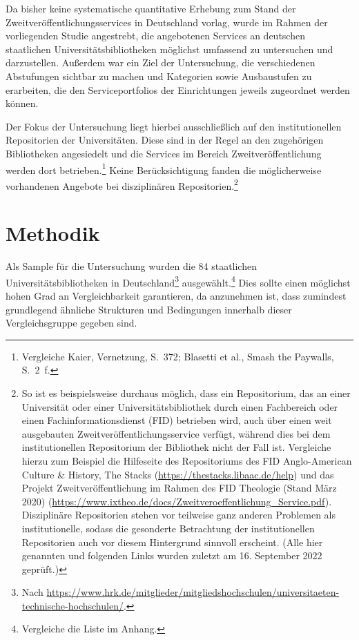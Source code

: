 \documentclass[a4paper,
fontsize=11pt,
oneside,
numbers=noperiodatend,
parskip=half-,
bibliography=totoc,
final
]{scrartcl}
\begin{document}
Da bisher keine systematische quantitative Erhebung zum Stand der
Zweitveröffentlichungsservices in Deutschland vorlag, wurde im Rahmen
der vorliegenden Studie angestrebt, die angebotenen Services an
deutschen staatlichen Universitätsbibliotheken möglichst umfassend zu
untersuchen und darzustellen. Außerdem war ein Ziel der Untersuchung,
die verschiedenen Abstufungen sichtbar zu machen und Kategorien sowie
Ausbaustufen zu erarbeiten, die den Serviceportfolios der Einrichtungen
jeweils zugeordnet werden können.

Der Fokus der Untersuchung liegt hierbei ausschließlich auf den
institutionellen Repositorien der Universitäten. Diese sind in der Regel
an den zugehörigen Bibliotheken angesiedelt und die Services im Bereich
Zweitveröffentlichung werden dort betrieben.\footnote{Vergleiche Kaier,
  Vernetzung, S.~372; Blasetti et al., Smash the Paywalls, S.~2~f.}
Keine Berücksichtigung fanden die möglicherweise vorhandenen Angebote
bei disziplinären Repositorien.\footnote{So ist es beispielsweise
  durchaus möglich, dass ein Repositorium, das an einer Universität oder
  einer Universitätsbibliothek durch einen Fachbereich oder einen
  Fachinformationsdienst (FID) betrieben wird, auch über einen weit
  ausgebauten Zweitveröffentlichungsservice verfügt, während dies bei
  dem institutionellen Repositorium der Bibliothek nicht der Fall ist.
  Vergleiche hierzu zum Beispiel die Hilfeseite des Repositoriums des
  FID Anglo-American Culture \& History, The Stacks
  (\url{https://thestacks.libaac.de/help}) und das Projekt
  Zweitveröffentlichung im Rahmen des FID Theologie (Stand März 2020)
  (\url{https://www.ixtheo.de/docs/Zweitveroeffentlichung_Service.pdf}).
  Disziplinäre Repositorien stehen vor teilweise ganz anderen Problemen
  als institutionelle, sodass die gesonderte Betrachtung der
  institutionellen Repositorien auch vor diesem Hintergrund sinnvoll
  erscheint. (Alle hier genannten und folgenden Links wurden zuletzt am
  16. September 2022 geprüft.)}

\hypertarget{methodik}{%
\section{Methodik}\label{methodik}}

Als Sample für die Untersuchung wurden die 84 staatlichen
Universitätsbibliotheken in Deutschland\footnote{Nach
  \url{https://www.hrk.de/mitglieder/mitgliedshochschulen/universitaeten-technische-hochschulen/}.}
ausgewählt.\footnote{Vergleiche die Liste im Anhang.} Dies sollte einen
möglichst hohen Grad an Vergleichbarkeit garantieren, da anzunehmen ist,
dass zumindest grundlegend ähnliche Strukturen und Bedingungen innerhalb
dieser Vergleichsgruppe gegeben sind.
\end{document}
